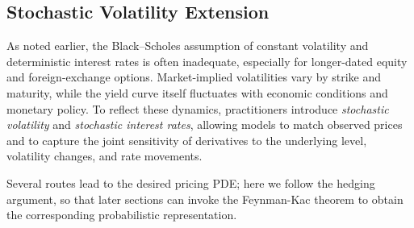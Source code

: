 \documentclass[12pt]{report} %
\theoremstyle{plain}           %
\theoremstyle{definition}      %
\theoremstyle{remark}          %
\begin{document}
\subsection{Stochastic Volatility Extension}\label{sec:sv_extension}

As noted earlier, the Black--Scholes assumption of constant volatility
and deterministic interest rates is often inadequate, especially for longer-dated equity
and foreign-exchange options. Market-implied volatilities vary by strike and maturity,
while the yield curve itself fluctuates with economic conditions and monetary policy.
To reflect these dynamics, practitioners introduce \emph{stochastic volatility} and
\emph{stochastic interest rates}, allowing models to match observed prices and to capture
the joint sensitivity of derivatives to the underlying level, volatility changes,
and rate movements.

Several routes lead to the desired pricing PDE; here we follow the hedging argument,
so that later sections can invoke the Feynman-Kac theorem to obtain the corresponding
probabilistic representation.
\end{document}
